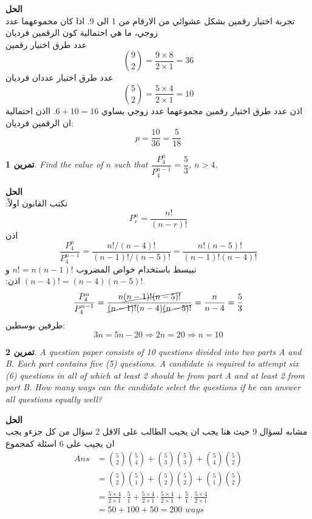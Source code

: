 \documentclass[14pt, a4paper, leqno]{extarticle}
\newcommand{\en}{\textenglish}
\theoremstyle{theoremstyle}
\newtheorem{example}{تمرين}
\newenvironment{solution}{\noindent\textbf{الحل}\vspace{3pt}\\}{}
\begin{document}
	\begin{solution}
		تجربة اختيار رقمين بشكل عشوائي من الارقام من 1 الى 9. اذا كان مجموعهما عدد زوجي، ما هي احتمالية كون الرقمين فرديان\\
		عدد طرق اختيار رقمين
		\[
		\binom{9}{2} = \frac{9\times 8}{2\times 1} = 36
		\]
		عدد طرق اختيار عددان فرديان
		\[
		\binom{5}{2} = \frac{5\times 4}{2\times1} = 10
		\]
		اذن عدد طرق اختيار رقمين مجموعهما عدد زوجي يساوي \(6+10=16\). ااذن احتمالية ان الرقمين فرديان:
		\[
		p = \frac{10}{36} = \frac{5}{18}
		\]
	\end{solution}
	
	\begin{example}
		\en{Find the value of \(n\) such that \(\dfrac{P^n_4}{P^{n-1}_4} = \dfrac{5}{3}\), \(n > 4\).}
	\end{example}
	
	\begin{solution}
		نكتب القانون اولاً:
		\[
		P^n_r = \frac{n!}{(n-r)!}
		\]
		اذن 
		\[
		\frac{P^n_4}{P^{n-1}_4} = \frac{n!/(n-4)!}{(n-1)!/(n-5)!} = \frac{n!(n-5)!}{(n-1)!(n-4)!}
		\]
		نبيسط باستخدام خواص المضروب \(n!=n(n-1)!\) و \((n-4)!=(n-4)(n-5)!\) اذن:
		\[
		\frac{P^n_4}{P^{n-1}_4} = \frac{n\cancel{(n-1)!(n-5)!}}{\cancel{(n-1)!}(n-4)\cancel{(n-5)!}} = \frac{n}{n-4} = \frac{5}{3}
		\]
		طرفين بوسطين:
		\[
		3n = 5n - 20 \Rightarrow 2n = 20 \Rightarrow n = 10
 		\]
	\end{solution}
	
	\begin{example}
		\en{A question paper consists of 10 questions divided into two parts A and B. Each part contains five (5) questions. A candidate is required to attempt six (6) questions in all of which at least 2 should be from part A and at least 2 from part B. How many ways can the candidate select the questions if he can answer all questions equally well?}
	\end{example}
	
	\begin{solution}
		مشابه لسؤال 9 حيث هنا يجب ان يجيب الطالب على الاقل 2 سؤال من كل جزءو يجب ان يجيب على 6 اسئلة كمجموع
		\begin{align*}
		\textit{Ans} &= \binom{5}{2}\binom{5}{4} + \binom{5}{3}\binom{5}{3} + \binom{5}{4}\binom{5}{2} \\
		&= \binom{5}{2}\binom{5}{1} + \binom{5}{2}\binom{5}{2} + \binom{5}{1}\binom{5}{2}\\
		& = \frac{5\times 4}{2\times1} \cdot\frac{5}{1} +  \frac{5\times 4}{2\times1} \cdot\frac{5\times 4}{2\times 1} + \frac{5}{1} \cdot\frac{5\times4}{2\times1}  \\
		&= 50 + 100 + 50 = 200 \,\,\textit{ways} 
		\end{align*}
	\end{solution}
	
\end{document}
